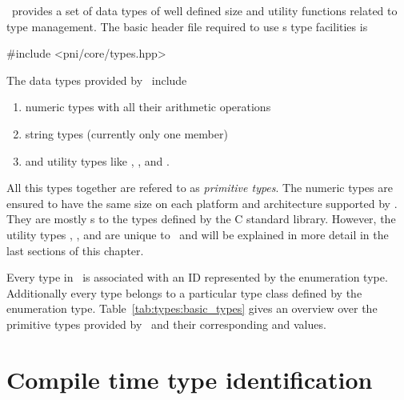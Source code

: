 \libpnicore\ provides a set of data types of well defined size and utility
functions related to type management. 
The basic header file required to use \libpnicore s type facilities is 
\begin{cppcode}
#include <pni/core/types.hpp>
\end{cppcode}
The data types provided by \libpnicore\ include
\begin{enumerate}
\item numeric types with all their arithmetic operations
\item string types (currently only one member)
\item and utility types like , , and .
\end{enumerate}
All this types together are refered to as \emph{ primitive types}.
The numeric types are ensured to have the same size on each
platform and architecture supported by \libpnicore. They are mostly
s to the types defined by the C standard library.  However, the
utility types , , and  are unique to
\libpnicore\ and will be explained in more detail in the last sections of this
chapter.

Every type in \libpnicore\ is associated with an ID represented by the 
 enumeration type. Additionally every type belongs to a
particular type class defined by the  enumeration type.
Table~\ref{tab:types:basic_types} gives an overview over the primitive types
provided by \libpnicore\ and their corresponding  and
 values.

\section{Compile time type identification}

